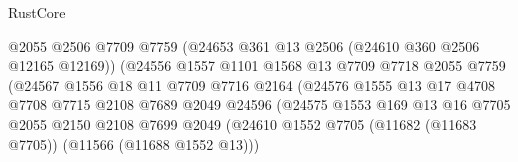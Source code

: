 \begin{lexlean}{RustCore}
\begin{coremodule}
                                          @2055
                                          @2506
                                          @7709
                                          @7759
                                          (@24653 @361 @13 @2506 (@24610 @360 @2506 @12165 @12169))
                                          (@24556
                                            @1557
                                            @1101
                                            @1568
                                            @13
                                            @7709
                                            @7718
                                            @2055
                                            @7759
                                            (@24567
                                              @1556
                                              @18
                                              @11
                                              @7709
                                              @7716
                                              @2164
                                              (@24576
                                                @1555
                                                @13
                                                @17
                                                @4708
                                                @7708
                                                @7715
                                                @2108
                                                @7689
                                                @2049
                                                @24596
                                                (@24575
                                                  @1553
                                                  @169
                                                  @13
                                                  @16
                                                  @7705
                                                  @2055
                                                  @2150
                                                  @2108
                                                  @7699
                                                  @2049
                                                  (@24610
                                                    @1552
                                                    @7705
                                                    (@11682 (@11683 @7705))
                                                    (@11566 (@11688 @1552 @13)))

\end{coremodule}
\end{lexlean}
